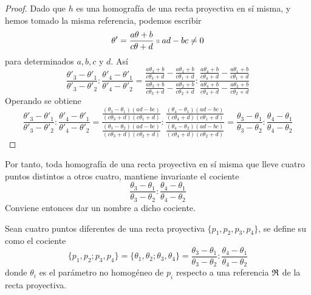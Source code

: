 \begin{proof}
	Dado que $h$ es una homografía de una recta proyectiva en sí misma, y hemos tomado la misma referencia, podemos escribir
	\begin{equation*}
		\theta'=\frac{a\theta+b}{c\theta +d}\shortparallel ad-bc\not=0
	\end{equation*}
	para determinados $a,b,c$ y $d$. Así
	\begin{equation*}
		\frac{\theta'_3-\theta'_1}{\theta'_3-\theta'_2}:\frac{\theta'_4-\theta'_1}{\theta'_4-\theta'_2}=\frac{\frac{a\theta_3+b}{c\theta_3 +d}-\frac{a\theta_1+b}{c\theta_1 +d}}{\frac{a\theta_3+b}{c\theta_3 +d}-\frac{a\theta_2+b}{c\theta_2 +d}}:\frac{\frac{a\theta_4+b}{c\theta_4 +d}-\frac{a\theta_1+b}{c\theta_1 +d}}{\frac{a\theta_4+b}{c\theta_4 +d}-\frac{a\theta_2+b}{c\theta_2+d}}
	\end{equation*}
	Operando se obtiene
	\begin{equation*}
		\frac{\theta'_3-\theta'_1}{\theta'_3-\theta'_2}:\frac{\theta'_4-\theta'_1}{\theta'_4-\theta'_2}=\frac{\frac{(\theta_3-\theta_1)(ad-bc)}{(c\theta_3+d)(c\theta_1+d)}}{\frac{(\theta_3-\theta_2)(ad-bc)}{(c\theta_3+d)(c\theta_2+d)}}:\frac{\frac{(\theta_4-\theta_1)(ad-bc)}{(c\theta_4+d)(c\theta_1+d)}}{\frac{(\theta_4-\theta_2)(ad-bc)}{(c\theta_4+d)(c\theta_2+d)}}=\frac{\theta_3-\theta_1}{\theta_3-\theta_2}:\frac{\theta_4-\theta_1}{\theta_4-\theta_2}
	\end{equation*}
\end{proof}
Por tanto, toda homografía de una recta proyectiva en sí misma que lleve cuatro puntos distintos a otros cuatro, mantiene invariante el cociente 
\begin{equation*}
	\frac{\theta_3-\theta_1}{\theta_3-\theta_2}:\frac{\theta_4-\theta_1}{\theta_4-\theta_2}
\end{equation*}
Conviene entonces dar un nombre a dicho cociente.
\begin{defi}
	Sean cuatro puntos diferentes de una recta proyectiva $\{p_1,p_2,p_3,p_4\}$, se define su  como el cociente
	\begin{equation}
	\{p_1,p_2;p_3,p_4\}=\{\theta_1,\theta_2;\theta_3,\theta_4\}=\frac{\theta_3-\theta_1}{\theta_3-\theta_2}:\frac{\theta_4-\theta_1}{\theta_4-\theta_2}
	\end{equation}
	donde $\theta_i$ es el parámetro no homogéneo de $p_i$ respecto a una referencia $\mathfrak{R}$ de la recta proyectiva.
\end{defi}
